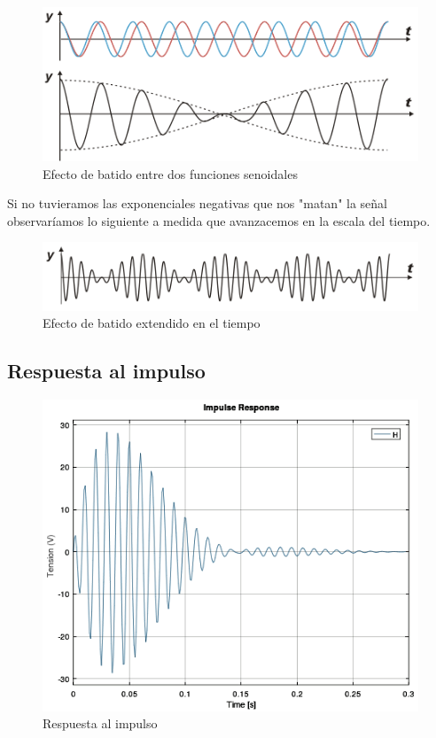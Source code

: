\documentclass[11pt,a4paper]{report}
\begin{document}
\bigskip
\begin{figure}[h!]
\centering
\includegraphics[scale=1]{EfectoBatido.png}
\caption{Efecto de batido entre dos funciones senoidales}
\end{figure}

Si no tuvieramos las exponenciales negativas que nos "matan" la señal observaríamos lo siguiente a medida que avanzacemos en la escala del tiempo.

\bigskip
\begin{figure}[h!]
\centering
\includegraphics[scale=1]{EfectoBatidoExtendido.png}
\caption{Efecto de batido extendido en el tiempo}
\end{figure}

\newpage
\subsection*{Respuesta al impulso}

\begin{figure}[h!]
\includegraphics[scale=0.7]{RtaImpulso.png}
\caption{Respuesta al impulso}
\end{figure}
\end{document}
